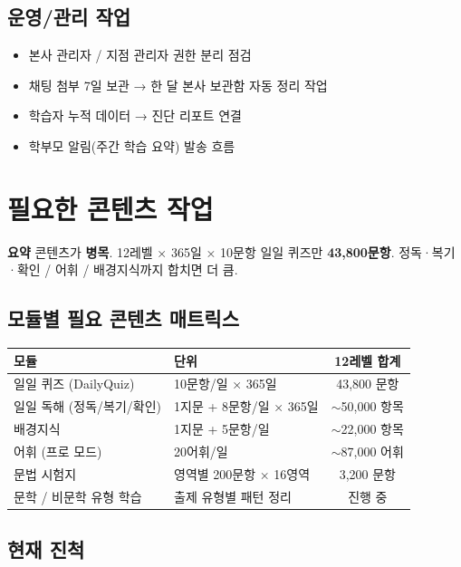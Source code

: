 \documentclass[11pt,a4paper]{article}
\newcommand{\summarybox}[1]{%
  \vspace{0.2cm}
  \noindent\colorbox{lightbg}{\parbox{\dimexpr\textwidth-2\fboxsep}{%
    \textbf{\color{korfarm}요약} \quad #1%
  }}
  \vspace{0.2cm}
}
\begin{document}
\subsection{운영/관리 작업}

\begin{itemize}
  \item 본사 관리자 / 지점 관리자 권한 분리 점검
  \item 채팅 첨부 7일 보관 → 한 달 본사 보관함 자동 정리 작업
  \item 학습자 누적 데이터 → 진단 리포트 연결
  \item 학부모 알림(주간 학습 요약) 발송 흐름
\end{itemize}

\newpage
\section{필요한 콘텐츠 작업}

\summarybox{콘텐츠가 \textbf{병목}. 12레벨 × 365일 × 10문항 일일 퀴즈만 \textbf{43,800문항}. 정독·복기·확인 / 어휘 / 배경지식까지 합치면 더 큼.}

\subsection{모듈별 필요 콘텐츠 매트릭스}

\begin{tabularx}{\textwidth}{lXc}
\toprule
\rowcolor{rowbg}\textbf{모듈} & \textbf{단위} & \textbf{12레벨 합계} \\
\midrule
일일 퀴즈 (DailyQuiz) & 10문항/일 × 365일 & 43,800 문항 \\
일일 독해 (정독/복기/확인) & 1지문 + 8문항/일 × 365일 & $\sim$50,000 항목 \\
배경지식 & 1지문 + 5문항/일 & $\sim$22,000 항목 \\
어휘 (프로 모드) & 20어휘/일 & $\sim$87,000 어휘 \\
문법 시험지 & 영역별 200문항 × 16영역 & 3,200 문항 \\
문학 / 비문학 유형 학습 & 출제 유형별 패턴 정리 & 진행 중 \\
\bottomrule
\end{tabularx}

\subsection{현재 진척}
\end{document}
